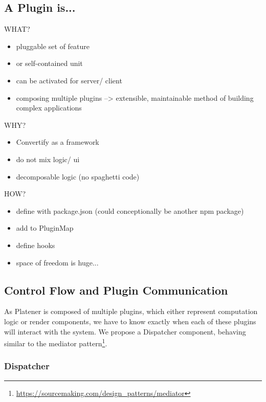\documentclass[../ClassicThesis.tex]{subfiles}
\begin{document}
\subsection{A Plugin is...}

WHAT?

\begin{itemize}
\item pluggable set of feature
\item or self-contained unit
\item can be activated for server/ client
\item composing multiple plugins --> extensible, maintainable method of building
  complex applications
\end{itemize}

WHY?

\begin{itemize}
\item Convertify as a framework
\item do not mix logic/ ui
\item decomposable logic (no spaghetti code)
\end{itemize}

HOW?

\begin{itemize}
\item define with package.json (could conceptionally be another npm package)
\item add to PluginMap
\item define hooks
\item space of freedom is huge...
\end{itemize}


\subsection{Control Flow and Plugin Communication}

As Platener is composed of multiple plugins, which either represent computation
logic or render components, we have to know exactly when each of these plugins
will interact with the system. We propose a Dispatcher component, behaving
similar to the mediator
pattern\footnote{\url{https://sourcemaking.com/design_patterns/mediator}}.

\subsubsection{Dispatcher}
\end{document}
